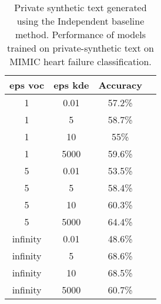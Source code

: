 \small{
\begin{table}
{
\begin{centering}
\begin{tabular}{c c c c}
\toprule
eps voc & eps kde & Accuracy \\
\midrule
\rule{0pt}{3ex}
   1 & 0.01 & 57.2\% \\
 1 & 5 & 58.7\% \\
 1 & 10 & 55\% \\
 1 & 5000 & 59.6\% \\
\hline
\rule{0pt}{3ex}
  5 & 0.01 & 53.5\% \\
 5 & 5 & 58.4\% \\
 5 & 10 & 60.3\% \\
 5 & 5000 & 64.4\% \\
\hline
\rule{0pt}{3ex}
  infinity & 0.01 & 48.6\% \\
 infinity & 5 & 68.6\% \\
 infinity & 10 & 68.5\% \\
 infinity & 5000 & 60.7\% \\
\bottomrule
\end{tabular}
\caption{ Private synthetic text generated using the Independent baseline method. Performance of models trained on private-synthetic text on MIMIC heart failure classification.} \label{tbl:mimic_results}
\end{centering}}
\end{table}
}





